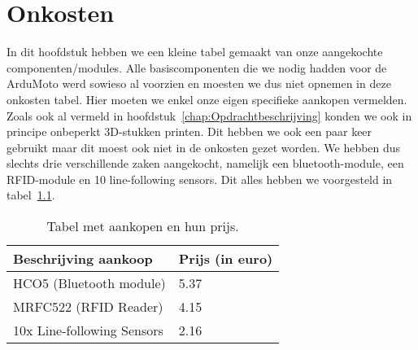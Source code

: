 \chapter{Onkosten}
In dit hoofdstuk hebben we een kleine tabel gemaakt van onze aangekochte componenten/modules. Alle basiscomponenten die we nodig hadden voor de ArduMoto werd sowieso al voorzien en moesten we dus niet opnemen in deze onkosten tabel. Hier moeten we enkel onze eigen specifieke aankopen vermelden. Zoals ook al vermeld in hoofdstuk~\ref{chap:Opdrachtbeschrijving} konden we ook in principe onbeperkt 3D-stukken printen. Dit hebben we ook een paar keer gebruikt maar dit moest ook niet in de onkosten gezet worden. We hebben dus slechts drie verschillende zaken aangekocht, namelijk een bluetooth-module, een RFID-module en 10 line-following sensors. Dit alles hebben we voorgesteld in tabel~\ref{table:Onkosten}.\\
\begin {table}[H]
\caption {Tabel met aankopen en hun prijs.} \label{table:Onkosten}
\begin{center}
	\begin{tabular}{ | l | l | }
	\hline
	Beschrijving aankoop & Prijs (in euro) \\ \hline
	\hline
	HCO5 (Bluetooth module) & 5.37 \\ \hline
	MRFC522 (RFID Reader) & 4.15 \\ \hline
	10x Line-following Sensors & 2.16 \\ \hline
	\end{tabular}
\end{center}
\end{table}
